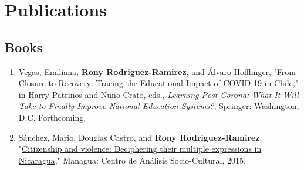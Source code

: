 \documentclass[a4paper, 10pt]{article}
\renewenvironment{itemize}{
  \begin{list}{}
    { \setlength{\itemsep}{5pt}
      \setlength{\parsep}{0pt}
      \setlength{\topsep}{0pt}
      \setlength{\leftmargin}{0em} } }{
  \end{list}}
\begin{document}





\section*{Publications}

\subsection*{Books}

\begin{enumerate}[leftmargin=10pt, label={}, itemindent=-10pt, nosep]
\item Vegas, Emiliana, \textbf{Rony Rodriguez-Ramirez}, and Álvaro Hofflinger, "From
Closure to Recovery: Tracing the Educational Impact of COVID-19 in Chile," in
Harry Patrinos and Nuno Crato, eds., \textit{Learning Post Corona: What It Will Take to
Finally Improve National Education Systems?}, Springer: Washington, D.C.
Forthcoming. 
\item Sánchez, Mario, Douglas Castro, and \textbf{Rony Rodriguez-Ramirez},
"\href{http://biblioteca.clacso.edu.ar/Nicaragua/casc-uca/20150313124733/Ciudadania-y-violencia.pdf}{Citizenship
and violence: Deciphering their multiple expressions in Nicaragua}," Managua:
Centro de Análisis Socio-Cultural, 2015. 
\end{enumerate}
\end{document}

